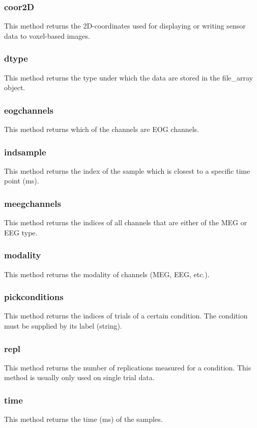 \subsubsection{coor2D}
This method returns the 2D-coordinates used for displaying or writing
sensor data to voxel-based images.

\subsubsection{dtype}
This method returns the type under which the data are stored in the
file\_array object. 

\subsubsection{eogchannels}
This method returns which of the channels are EOG channels.

\subsubsection{indsample}
This method returns the index of the sample which is closest to a
specific time point (ms).

\subsubsection{meegchannels}
This method returns the indices of all channels that are either of the
MEG or EEG type. 

\subsubsection{modality}
This method returns the modality of channels (MEG, EEG, etc.).

\subsubsection{pickconditions}
This method returns the indices of trials of a certain condition. The
condition must be supplied by its label (string).

\subsubsection{repl}
This method returns the number of replications measured for a
condition. This method is usually only used on single trial data.

\subsubsection{time}
This method returns the time (ms) of the samples.

